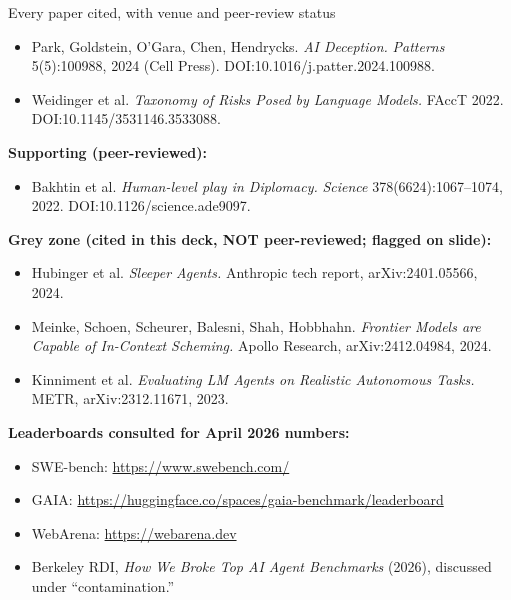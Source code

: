 \documentclass[aspectratio=169, 12pt, xcolor={dvipsnames,table}]{beamer}
\begin{document}
\begin{frame}[allowframebreaks]{Every paper cited, with venue and peer-review status}
\begin{itemize}
    \item Park, Goldstein, O'Gara, Chen, Hendrycks. \emph{AI Deception.} \emph{Patterns} 5(5):100988, 2024 (Cell Press). DOI:10.1016/j.patter.2024.100988.
    \item Weidinger et al. \emph{Taxonomy of Risks Posed by Language Models.} FAccT 2022. DOI:10.1145/3531146.3533088.
  \end{itemize}
  \textbf{Supporting (peer-reviewed):}
  \begin{itemize}\setlength\itemsep{0.35em}
    \item Bakhtin et al. \emph{Human-level play in Diplomacy.} \emph{Science} 378(6624):1067--1074, 2022. DOI:10.1126/science.ade9097.
  \end{itemize}
  \textbf{Grey zone (cited in this deck, \textbf{NOT} peer-reviewed; flagged on slide):}
  \begin{itemize}\setlength\itemsep{0.35em}
    \item Hubinger et al. \emph{Sleeper Agents.} Anthropic tech report, arXiv:2401.05566, 2024.
    \item Meinke, Schoen, Scheurer, Balesni, Shah, Hobbhahn. \emph{Frontier Models are Capable of In-Context Scheming.} Apollo Research, arXiv:2412.04984, 2024.
    \item Kinniment et al. \emph{Evaluating LM Agents on Realistic Autonomous Tasks.} METR, arXiv:2312.11671, 2023.
  \end{itemize}
  \textbf{Leaderboards consulted for April 2026 numbers:}
  \begin{itemize}\setlength\itemsep{0.35em}
    \item SWE-bench: \url{https://www.swebench.com/}
    \item GAIA: \url{https://huggingface.co/spaces/gaia-benchmark/leaderboard}
    \item WebArena: \url{https://webarena.dev}
    \item Berkeley RDI, \emph{How We Broke Top AI Agent Benchmarks} (2026), discussed under ``contamination.''
  \end{itemize}
\end{frame}
\end{document}
